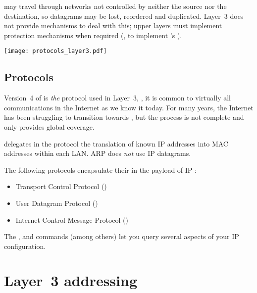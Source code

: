  may travel through networks not controlled 
by neither the source nor the destination, so datagrams may be lost, reordered and duplicated.
% 
Layer~3 does not provide mechanisms to deal with this; upper layers must implement
protection mechanisms when required 
(\eg, to implement 's ).

\begin{center}
\texttt{[image: protocols\_layer3.pdf]}
\end{center}


\vspace{-0.25cm}
\subsection*{Protocols}

Version~4 of  is \textit{the} protocol used in Layer~3, \ie,
it is common to virtually all communications in the Internet as we know it today.
% 
For many years, the Internet has been struggling to transition towards , 
but the process is not complete and only  provides global coverage.

 delegates in the  protocol the translation of known IP addresses 
into MAC addresses within each LAN. ARP does \textit{not} use IP datagrams.

The following protocols encapsulate their  in the payload of IP 
:\\[-0.6cm]
\begin{itemize}
\item Transport Control Protocol () 
\item User Datagram Protocol ()
\item Internet Control Message Protocol ()
\end{itemize}

\begin{remark}
The ,  and  commands 
(among others) let you query several aspects of your IP configuration.
\end{remark}



\section{Layer~3 addressing}

